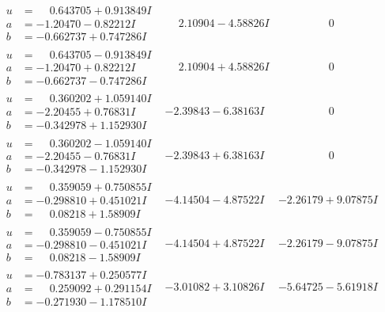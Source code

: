 \documentclass[1p]{elsarticle_modified}
\theoremstyle{definition}
\begin{document}
$$\begin{array}{c|c|c}
\begin{aligned}
u &= \phantom{-}0.643705 + 0.913849 I \\
a &= -1.20470 - 0.82212 I \\
b &= -0.662737 + 0.747286 I\end{aligned}
 & \phantom{-}2.10904 - 4.58826 I & \phantom{-0.000000 } 0 \\ \hline\begin{aligned}
u &= \phantom{-}0.643705 - 0.913849 I \\
a &= -1.20470 + 0.82212 I \\
b &= -0.662737 - 0.747286 I\end{aligned}
 & \phantom{-}2.10904 + 4.58826 I & \phantom{-0.000000 } 0 \\ \hline\begin{aligned}
u &= \phantom{-}0.360202 + 1.059140 I \\
a &= -2.20455 + 0.76831 I \\
b &= -0.342978 + 1.152930 I\end{aligned}
 & -2.39843 - 6.38163 I & \phantom{-0.000000 } 0 \\ \hline\begin{aligned}
u &= \phantom{-}0.360202 - 1.059140 I \\
a &= -2.20455 - 0.76831 I \\
b &= -0.342978 - 1.152930 I\end{aligned}
 & -2.39843 + 6.38163 I & \phantom{-0.000000 } 0 \\ \hline\begin{aligned}
u &= \phantom{-}0.359059 + 0.750855 I \\
a &= -0.298810 + 0.451021 I \\
b &= \phantom{-}0.08218 + 1.58909 I\end{aligned}
 & -4.14504 - 4.87522 I & -2.26179 + 9.07875 I \\ \hline\begin{aligned}
u &= \phantom{-}0.359059 - 0.750855 I \\
a &= -0.298810 - 0.451021 I \\
b &= \phantom{-}0.08218 - 1.58909 I\end{aligned}
 & -4.14504 + 4.87522 I & -2.26179 - 9.07875 I \\ \hline\begin{aligned}
u &= -0.783137 + 0.250577 I \\
a &= \phantom{-}0.259092 + 0.291154 I \\
b &= -0.271930 - 1.178510 I\end{aligned}
 & -3.01082 + 3.10826 I & -5.64725 - 5.61918 I \\ \hline\begin{aligned}

\end{aligned}
\end{array}$$
\end{document}
